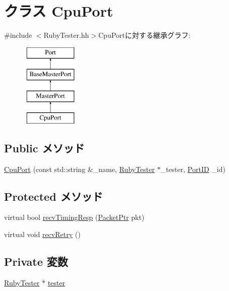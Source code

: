 \hypertarget{classRubyTester_1_1CpuPort}{
\section{クラス CpuPort}
\label{classRubyTester_1_1CpuPort}
}


{\ttfamily \#include $<$RubyTester.hh$>$}CpuPortに対する継承グラフ:\begin{figure}[H]
\begin{center}
\leavevmode
\includegraphics[height=4cm]{classRubyTester_1_1CpuPort}
\end{center}
\end{figure}
\subsection*{Public メソッド}
\begin{DoxyCompactItemize}
\item 
\hyperlink{classRubyTester_1_1CpuPort_ab42430e504c30ece2d58208d525c99de}{CpuPort} (const std::string \&\_\-name, \hyperlink{classRubyTester_1_1RubyTester}{RubyTester} $\ast$\_\-tester, \hyperlink{base_2types_8hh_acef4d7d41cb21fdc252e20c04cd7bb8e}{PortID} \_\-id)
\end{DoxyCompactItemize}
\subsection*{Protected メソッド}
\begin{DoxyCompactItemize}
\item 
virtual bool \hyperlink{classRubyTester_1_1CpuPort_a482dba5588f4bee43e498875a61e5e0b}{recvTimingResp} (\hyperlink{classPacket}{PacketPtr} pkt)
\item 
virtual void \hyperlink{classRubyTester_1_1CpuPort_a7ec461ad187b82b4b21e27c86e45cf9c}{recvRetry} ()
\end{DoxyCompactItemize}
\subsection*{Private 変数}
\begin{DoxyCompactItemize}
\item 
\hyperlink{classRubyTester_1_1RubyTester}{RubyTester} $\ast$ \hyperlink{classRubyTester_1_1CpuPort_a5f8ba0d5be58d6302adaccb375d74bc2}{tester}
\end{DoxyCompactItemize}


